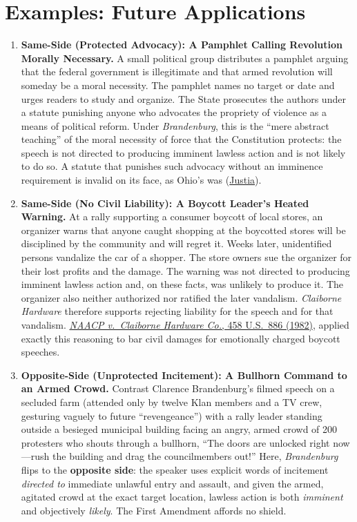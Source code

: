 \documentclass[12pt]{article}
\begin{document}
\section{Examples: Future Applications}
\begin{enumerate}

\item \textbf{Same-Side (Protected Advocacy): A Pamphlet Calling Revolution Morally Necessary.} A small political group distributes a pamphlet arguing that the federal government is illegitimate and that armed revolution will someday be a moral necessity. The pamphlet names no target or date and urges readers to study and organize. The State prosecutes the authors under a statute punishing anyone who advocates the propriety of violence as a means of political reform. Under \textit{Brandenburg}, this is the ``mere abstract teaching'' of the moral necessity of force that the Constitution protects: the speech is not directed to producing imminent lawless action and is not likely to do so. A statute that punishes such advocacy without an imminence requirement is invalid on its face, as Ohio's was (\href{https://supreme.justia.com/cases/federal/us/395/444/}{Justia}).

\item \textbf{Same-Side (No Civil Liability): A Boycott Leader's Heated Warning.} At a rally supporting a consumer boycott of local stores, an organizer warns that anyone caught shopping at the boycotted stores will be disciplined by the community and will regret it. Weeks later, unidentified persons vandalize the car of a shopper. The store owners sue the organizer for their lost profits and the damage. The warning was not directed to producing imminent lawless action and, on these facts, was unlikely to produce it. The organizer also neither authorized nor ratified the later vandalism. \textit{Claiborne Hardware} therefore supports rejecting liability for the speech and for that vandalism. \href{https://supreme.justia.com/cases/federal/us/458/886/}{\emph{NAACP v.\ Claiborne Hardware Co.}, 458 U.S.\ 886 (1982)}, applied exactly this reasoning to bar civil damages for emotionally charged boycott speeches.

\item \textbf{Opposite-Side (Unprotected Incitement): A Bullhorn Command to an Armed Crowd.} Contrast Clarence Brandenburg's filmed speech on a secluded farm (attended only by twelve Klan members and a TV crew, gesturing vaguely to future ``revengeance'') with a rally leader standing outside a besieged municipal building facing an angry, armed crowd of 200 protesters who shouts through a bullhorn, ``The doors are unlocked right now---rush the building and drag the councilmembers out!'' Here, \emph{Brandenburg} flips to the \textbf{opposite side}: the speaker uses explicit words of incitement \emph{directed to} immediate unlawful entry and assault, and given the armed, agitated crowd at the exact target location, lawless action is both \emph{imminent} and objectively \emph{likely}. The First Amendment affords no shield.


\end{enumerate}
\end{document}
